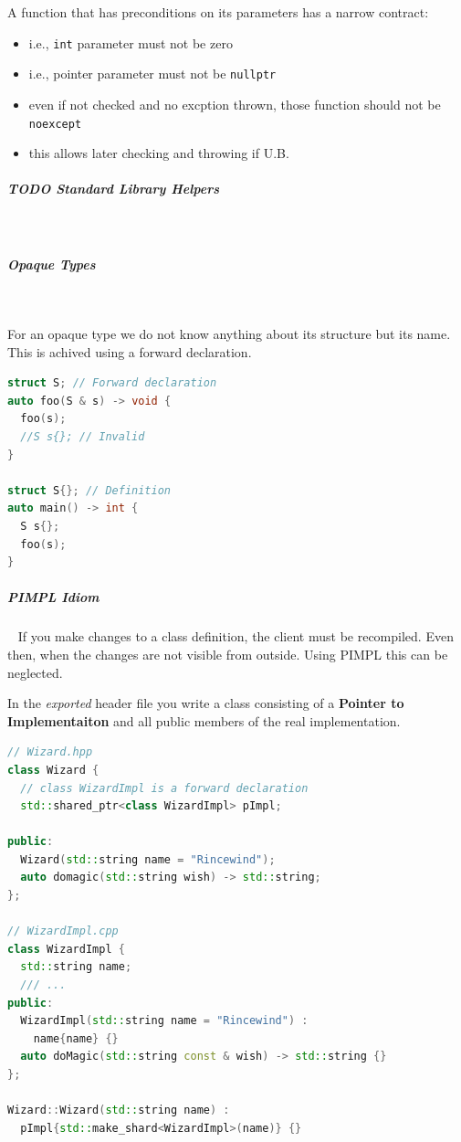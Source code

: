 \documentclass[11pt,twoside,landscape]{article}
\begin{document}
\begin{multicols}{2}
A function that has preconditions on its parameters has a narrow contract:
\begin{itemize}
\item i.e., \texttt{int} parameter must not be zero
\item i.e., pointer parameter must not be \texttt{nullptr}
\item even if not checked and no excption thrown, those function should not be \texttt{noexcept}
\item this allows later checking and throwing if U.B.
\end{itemize}

\subparagraph{{\bfseries\sffamily TODO} Standard Library Helpers} \
\label{sec:org4365a0c}
\subparagraph{Opaque Types} \
\label{sec:org2509f3b}

For an opaque type we do not know anything about its structure but its name.
This is achived using a forward declaration.

\begin{lstlisting}[language=c++,label=lst:org77b695a,numbers=none]
struct S; // Forward declaration
auto foo(S & s) -> void {
  foo(s);
  //S s{}; // Invalid
}

struct S{}; // Definition
auto main() -> int {
  S s{};
  foo(s);
}
\end{lstlisting}

\subparagraph{PIMPL Idiom} \
\label{sec:org375dde3}
If you make changes to a class definition, the client must be recompiled.
Even then, when the changes are not visible from outside.
Using PIMPL this can be neglected.

In the \emph{exported} header file you write a class consisting of a \textbf{Pointer to Implementaiton} and all public members of the real implementation.

\begin{lstlisting}[language=c++,caption={PIMPL example using shared\textsubscript{ptr}},captionpos=b,numbers=none]
// Wizard.hpp
class Wizard {
  // class WizardImpl is a forward declaration
  std::shared_ptr<class WizardImpl> pImpl;

public:
  Wizard(std::string name = "Rincewind");
  auto domagic(std::string wish) -> std::string;
};

// WizardImpl.cpp
class WizardImpl {
  std::string name;
  /// ...
public:
  WizardImpl(std::string name = "Rincewind") :
    name{name} {}
  auto doMagic(std::string const & wish) -> std::string {}
};

Wizard::Wizard(std::string name) :
  pImpl{std::make_shard<WizardImpl>(name)} {}


\end{lstlisting}
\end{multicols}
\end{document}
